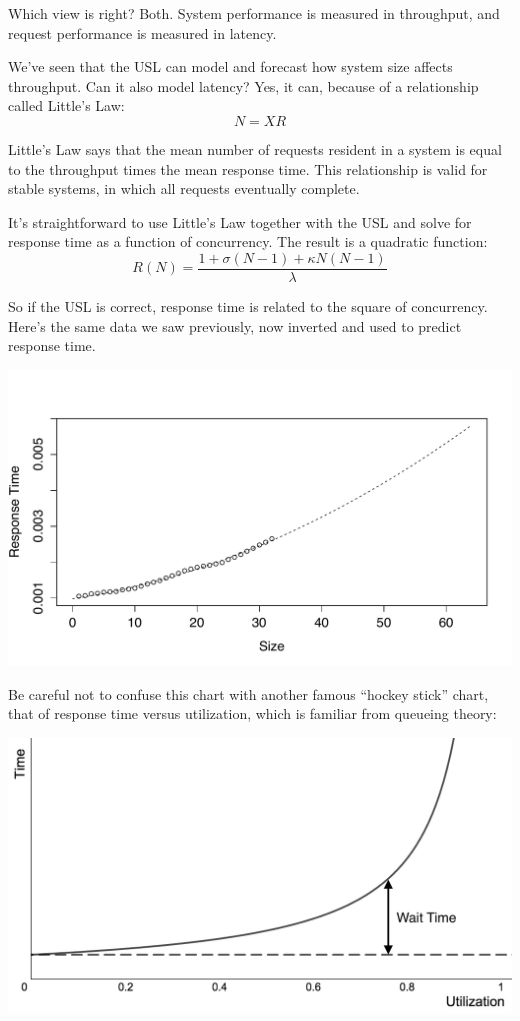 \documentclass{vivid_layout}
\begin{document}
Which view is right? Both. System performance is measured in throughput, and
request performance is measured in latency.

We've seen that the USL can model and forecast how system size affects
throughput. Can it also model latency? Yes, it can, because of a
relationship called Little's Law:
\[
N = X R
\]

Little's Law says that the mean number of requests resident in a system is
equal to the throughput times the mean response time. This relationship is
valid for stable systems, in which all requests eventually complete.

It's straightforward to use Little's Law together with the USL and solve for
response time as a function of concurrency.  The result is a quadratic function:
\[
R(N)=\frac{1+\sigma(N-1)+\kappa N(N-1)}{\lambda}
\]

So if the USL is correct, response time is related to the square of
concurrency. Here's the same data we saw previously, now inverted and used to
predict response time.
\begin{center}
\includegraphics[width=.85\linewidth]{scalability/cisco-tput}
\end{center}

Be careful not to confuse this chart with another famous ``hockey stick'' chart,
that of response time versus utilization, which is familiar from queueing
theory:
\begin{center}
\includegraphics[width=.85\linewidth]{queueing-theory/hockey-stick-1}
\end{center}
\end{document}
